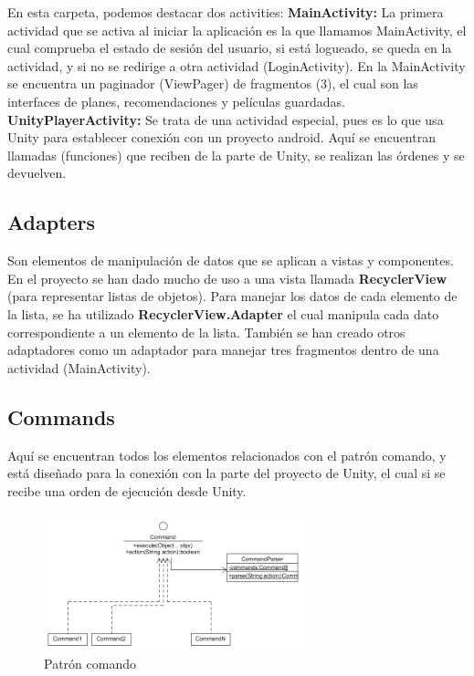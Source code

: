 En esta carpeta, podemos destacar dos activities: \textbf{MainActivity:} La primera actividad que se activa al iniciar la aplicación es la que llamamos MainActivity, el cual comprueba el estado de sesión del usuario, si está logueado, se queda en la actividad, y si no se redirige a otra actividad (LoginActivity). En la MainActivity se encuentra un paginador (ViewPager) de fragmentos (3), el cual son las interfaces de planes, 
recomendaciones y películas guardadas. \textbf{UnityPlayerActivity:} Se trata de una actividad especial, pues es lo que usa Unity para establecer conexión con un proyecto android. Aquí se encuentran llamadas (funciones) que reciben de la parte de Unity, se realizan las órdenes y se devuelven.

\subsection{Adapters}
\label{makereference4.3.2} 
Son elementos de manipulación de datos que se aplican a vistas y componentes. En el proyecto se han dado mucho de uso a una vista llamada \textbf{RecyclerView} (para representar listas de objetos). Para manejar los datos de cada elemento de la lista, se ha utilizado \textbf{RecyclerView.Adapter} el cual manipula cada dato correspondiente a un elemento de la lista. También se han creado otros adaptadores como un adaptador para manejar tres fragmentos dentro de una actividad (MainActivity).

\subsection{Commands}
\label{makereference4.3.3}
Aquí se encuentran todos los elementos relacionados con el patrón comando, y está diseñado para la conexión con la parte del proyecto de Unity, el cual si se recibe una orden de ejecución desde Unity.

\begin{figure}[H]
    \centering
    \includegraphics[width=3in]{figures/chapter-4/command_pattern.png}
    \caption{Patrón comando}
\end{figure}

